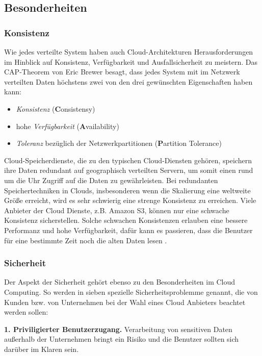\subsection{Besonderheiten}
\subsubsection{Konsistenz}
Wie jedes verteilte System haben auch Cloud-Architekturen Herausforderungen im Hinblick auf Konsistenz, Verfügbarkeit und Ausfallsicherheit zu meistern.
Das CAP-Theorem\cite{CAP} von Eric Brewer besagt, dass jedes System mit im Netzwerk verteilten Daten höchstens zwei von den drei gewünschten Eigenschaften haben kann:
\begin{itemize}
	\item \textit{Konsistenz} (\textbf{C}onsistensy)
	\item hohe \textit{Verfügbarkeit} (\textbf{A}vailability)
	\item \textit{Toleranz} bezüglich der Netzwerkpartitionen (\textbf{P}artition Tolerance)
\end{itemize}

Cloud-Speicherdienste, die zu den typischen Cloud-Diensten gehören, speichern ihre Daten redundant auf geographisch verteilten Servern, um somit einen rund um die Uhr Zugriff auf die Daten zu gewährleisten.
Bei redundanten Speichertechniken in Clouds, insbesonderen wenn die Skalierung eine weltweite Größe erreicht, wird es sehr schwierig eine strenge Konsistenz zu erreichen. Viele Anbieter der Cloud Dienste, z.B. Amazon S3, können nur eine schwache Konsistenz
sicherstellen. Solche schwachen Konsistenzen erlauben eine bessere Performanz und hohe Verfügbarkeit, dafür kann es passieren, dass die Benutzer für eine bestimmte Zeit noch die alten Daten lesen \cite{consistency-as-a-service}.

\subsubsection{Sicherheit}
Der Aspekt der Sicherheit gehört ebenso zu den Besonderheiten im Cloud Computing. So werden in \cite{seven-seq-risks} sieben spezielle Sicherheitsproblemme genannt, die von Kunden bzw. von Unternehmen bei der Wahl eines Cloud Anbieters beachtet werden sollen:

\textbf{1. Priviligierter Benutzerzugang.} Verarbeitung von sensitiven Daten außerhalb der Unternehmen bringt ein Risiko und die Benutzer sollten sich darüber im Klaren sein.

